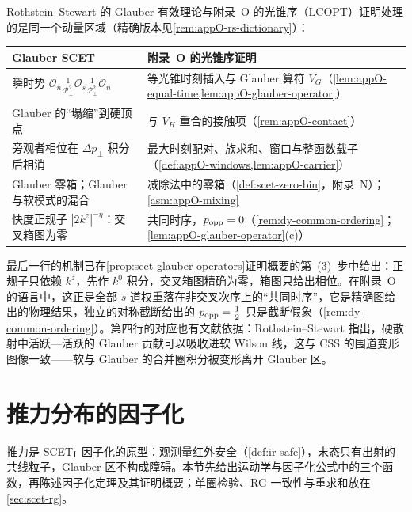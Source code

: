 \begin{remark}\label{rem:scet-glauber-dictionary}
Rothstein--Stewart 的 Glauber 有效理论与附录~O 的光锥序（LCOPT）证明处理的是同一个动量区域（精确版本见\cref{rem:appO-rs-dictionary}）：
\begin{center}\small
\renewcommand{\arraystretch}{1.1}
\begin{tabular}{@{}p{}p{}@{}}
\toprule
Glauber SCET\cite{RothsteinStewart2016} & 附录~O 的光锥序证明 \\
\midrule
瞬时势 $\mathcal O_n\frac{1}{\mathcal P_\perp^2}\mathcal O_s\frac{1}{\mathcal P_\perp^2}\mathcal O_{\bar n}$ & 等光锥时刻插入与 Glauber 算符 $V_G$（\cref{lem:appO-equal-time,lem:appO-glauber-operator}） \\
Glauber 的“塌缩”到硬顶点 & 与 $V_H$ 重合的接触项（\cref{rem:appO-contact}） \\
旁观者相位在 $\Delta p_\perp$ 积分后相消 & 最大时刻配对、族求和、窗口与整函数载子（\cref{def:appO-windows,lem:appO-carrier}） \\
Glauber 零箱；Glauber 与软模式的混合 & 减除法中的零箱（\cref{def:scet-zero-bin}，附录~N）；\cref{asm:appO-mixing} \\
快度正规子 $|2k^z|^{-\eta}$：交叉箱图为零 & 共同时序，$p_{\rm opp}=0$（\cref{rem:dy-common-ordering}；\cref{lem:appO-glauber-operator}(c)） \\
\bottomrule
\end{tabular}
\end{center}
最后一行的机制已在\cref{prop:scet-glauber-operators}证明概要的第~(3)~步中给出：正规子只依赖 $k^z$，先作 $k^0$ 积分，交叉箱图精确为零，箱图只给出相位。在附录~O 的语言中，这正是全部 $s$ 道权重落在非交叉次序上的“共同时序”，它是精确图给出的物理结果，独立的对称截断给出的 $p_{\rm opp}=\frac12$ 只是截断假象（\cref{rem:dy-common-ordering}）。第四行的对应也有文献依据：Rothstein--Stewart 指出，硬散射中活跃—活跃的 Glauber 贡献可以吸收进软 Wilson 线，这与 CSS 的围道变形图像一致——软与 Glauber 的合并圈积分被变形离开 Glauber 区\cite[第~10.1~节]{RothsteinStewart2016}。
\end{remark}

\section{推力分布的因子化}\label{sec:scet-thrust}

推力是 SCET$_{\rm I}$ 因子化的原型：观测量红外安全（\cref{def:ir-safe}），末态只有出射的共线粒子，Glauber 区不构成障碍。本节先给出运动学与因子化公式中的三个函数，再陈述因子化定理及其证明概要；单圈检验、RG 一致性与重求和放在\cref{sec:scet-rg}。

